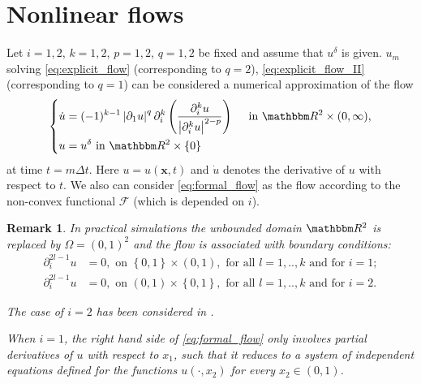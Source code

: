 \documentclass[runningheads,a4paper]{llncs}\usepackage{latexsym}
\newcommand{\R}{\mathbbm R}
\newcommand{\ud}{u^\delta}
\newcommand{\abs}[1]{\left| #1 \right|}
\newcommand{\set}[1]{\left\{ #1 \right\}}
\newtheorem{rem}[thm]{Remark}
\begin{document}
\section{Nonlinear flows}
\label{sec:flows}
Let $i=1,2$, $k=1,2$, $p=1,2$, $q=1,2$ be fixed and assume that $\ud$ is given.
$u_m$ solving \eqref{eq:explicit_flow} (corresponding to $q=2$), \eqref{eq:explicit_flow_II} (corresponding to $q=1$) can be 
considered a numerical approximation of the flow
\begin{equation} \label{eq:formal_flow}
\left\{ \begin{aligned}
 \dot{u} &= (-1)^{k-1}\abs{\partial_1 u}^q \partial_i^k \left(\frac{\partial_i^k u}{\abs{\partial_i^k u}^{2-p}} \right)\quad 
 \text{ in } \R^2\times (0,\infty),\\
 u &=\ud \text{ in } \R^2  \times \set{0}
\end{aligned}\right.
\end{equation}
at time $t = m\Delta t$. Here $u=u(\mathbf{x},t)$ and $\dot{u}$ denotes the derivative of $u$ with respect to $t$. 
We also can consider \eqref{eq:formal_flow} as the flow according to the non-convex functional $\mathcal{F}$ (which is depended on $i$).

\begin{rem}
In practical simulations the unbounded domain $\R^2$ is replaced by $\Omega = (0,1)^2$ and the flow 
is associated with boundary conditions:
\begin{equation*}
 \begin{aligned}
  \partial_i^{2l-1} u& = 0,\text{ on }\set{0,1} \times (0,1)  , \text{ for all } l=1,..,k \text{ and for } i=1;\\  \partial_i^{2l-1} u & = 0,\text{ on } (0,1) \times \set{0,1}, \text{ for all } l=1,..,k \text{ and for } i=2.
 \end{aligned}
\end{equation*}

The case of $i=2$ has been considered in \cite{DonPatSchOek15}.
 
When $i=1$, the right hand side of \eqref{eq:formal_flow} only involves partial 
derivatives of $u$ with respect to $x_1$, such that it reduces to a system of independent 
equations defined for the functions $u(\cdot,x_2)$ for every $x_2 \in (0,1)$.
\end{rem}
\end{document}
